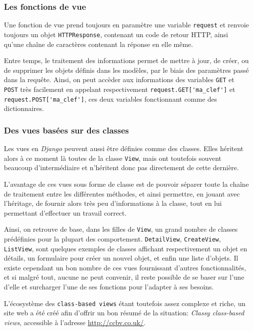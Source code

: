 \documentclass[a4paper]{report}
\begin{document}
\subsubsection{Les fonctions de vue}
\label{ssub:Les fonctions de vue}
\par Une fonction de vue prend toujours en paramètre une variable \verb#request# et renvoie toujours un objet
\verb#HTTPResponse#, contenant un code de retour HTTP, ainsi qu'une chaîne de caractères contenant la réponse en elle
même.
\par Entre temps, le traitement des informations permet de mettre à jour, de créer, ou de supprimer les objets définis
dans les modèles, par le biais des paramètres passé dans la requête. Ainsi, on peut accèder aux informations des
variables \verb#GET# et \verb#POST# très facilement en appelant respectivement \verb#request.GET['ma_clef']# et
\verb#request.POST['ma_clef']#, ces deux variables fonctionnant comme des dictionnaires.

\subsubsection{Des vues basées sur des classes}
\label{ssub:Des vues basées sur des classes}
\par Les vues en \emph{Django} peuvent aussi être définies comme des classes. Elles héritent alors à ce moment là toutes de la
classe \verb#View#, mais ont toutefois souvent beaucoup d'intermédiaire et n'héritent donc pas directement de cette
dernière.
\par L'avantage de ces vues sous forme de classe est de pouvoir séparer toute la chaîne de traitement entre les
différentes méthodes, et ainsi permettre, en jouant avec l'héritage, de fournir alors très peu d'informations à la
classe, tout en lui permettant d'effectuer un travail correct.
\par Ainsi, on retrouve de base, dans les filles de \verb#View#, un grand nombre de classes prédéfinies pour la plupart
des comportement. \verb#DetailView#, \verb#CreateView#, \verb#ListView#, sont quelques exemples de classes affichant
respectivement un objet en détails, un formulaire pour créer un nouvel objet, et enfin une liste d'objets. Il existe
cependant un bon nombre de ces vues fournissant d'autres fonctionnalités, et si malgré tout, aucune ne peut convenir, il
reste possible de se baser sur l'une d'elle et surcharger l'une de ses fonctions pour l'adapter à ses besoins.
\par L'écosystème des \verb#class-based views# étant toutefois assez complexe et riche, un site web a été créé afin
d'offrir un bon résumé de la situation: \emph{Classy class-based views}, accessible à l'adresse
\url{http://ccbv.co.uk/}.
\end{document}
